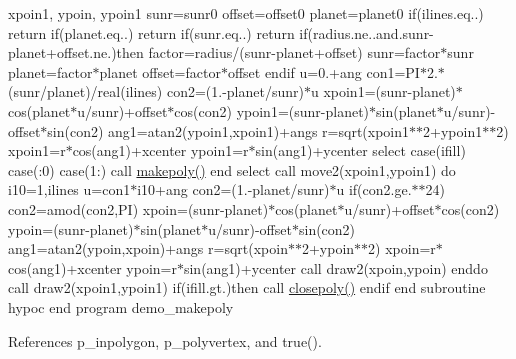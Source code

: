 xpoin1, ypoin, ypoin1 sunr=sunr0 offset=offset0 planet=planet0 if(ilines.\+eq..) return if(planet.\+eq..) return if(sunr.\+eq..) return if(radius.\+ne..\+and.\+sunr-\/planet+offset.ne.)then factor=radius/(sunr-\/planet+offset) sunr=factor$\ast$sunr planet=factor$\ast$planet offset=factor$\ast$offset endif u=0.+ang con1=P\+I$\ast$2.$\ast$(sunr/planet)/real(ilines) con2=(1.-\/planet/sunr)$\ast$u xpoin1=(sunr-\/planet)$\ast$cos(planet$\ast$u/sunr)+offset$\ast$cos(con2) ypoin1=(sunr-\/planet)$\ast$sin(planet$\ast$u/sunr)-\/offset$\ast$sin(con2) ang1=atan2(ypoin1,xpoin1)+angs r=sqrt(xpoin1$\ast$$\ast$2+ypoin1$\ast$$\ast$2) xpoin1=r$\ast$cos(ang1)+xcenter ypoin1=r$\ast$sin(ang1)+ycenter select case(ifill) case(\+:0) case(1\+:) call \hyperlink{namespacem__pixel_ab7128437f95b40004bf73fc6e3f597f8}{makepoly()} end select call move2(xpoin1,ypoin1) do i10=1,ilines u=con1$\ast$i10+ang con2=(1.-\/planet/sunr)$\ast$u if(con2.\+ge.$\ast$$\ast$24) con2=amod(con2,\+P\+I) xpoin=(sunr-\/planet)$\ast$cos(planet$\ast$u/sunr)+offset$\ast$cos(con2) ypoin=(sunr-\/planet)$\ast$sin(planet$\ast$u/sunr)-\/offset$\ast$sin(con2) ang1=atan2(ypoin,xpoin)+angs r=sqrt(xpoin$\ast$$\ast$2+ypoin$\ast$$\ast$2) xpoin=r$\ast$cos(ang1)+xcenter ypoin=r$\ast$sin(ang1)+ycenter call draw2(xpoin,ypoin) enddo call draw2(xpoin1,ypoin1) if(ifill.\+gt.)then call \hyperlink{namespacem__pixel_ab3dc83b63d2ab1bf3f63932abca4245d}{closepoly()} endif end subroutine hypoc end program demo\+\_\+makepoly 

References p\+\_\+inpolygon, p\+\_\+polyvertex, and true().

